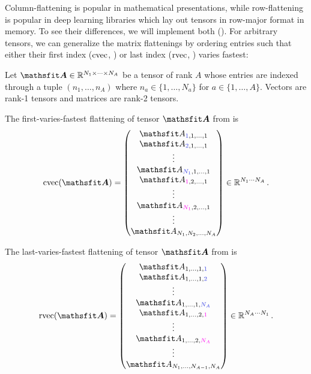 Column-flattening is popular in mathematical presentations, while row-flattening is popular in deep learning libraries which lay out tensors in row-major format in memory.
To see their differences, we will implement both ().
For arbitrary tensors, we can generalize the matrix flattenings by ordering entries such that either their first index ($\operatorname{cvec}$, ) or last index ($\operatorname{rvec}$, ) varies fastest:


\begin{setup}\label{setup:flattening}
  Let $\tA \in \sR^{N_1 \times \dots \times N_A}$ be a tensor of rank $A$ whose entries are indexed through a tuple $(n_1, \dots, n_A)$ where $n_a \in \{1, \dots, N_a\}$ for $a \in \{1, \dots, A\}$.
  Vectors are rank-1 tensors and matrices are rank-2 tensors.
\end{setup}
\begin{definition}\label{def:cvec}
  The first-varies-fastest flattening of tensor $\tA$ from  is
  \begin{align*}
    \cvec(\tA) =
    \begin{pmatrix}
      \etA_{\colored{1},1,\dots,1}   \\
      \etA_{\colored{2},1,\dots,1}   \\
      \vdots               \\
      \etA_{\colored{N_1},1,\dots,1} \\
      \etA_{\colored[VectorPink]{1},2,\dots,1}   \\
      \vdots               \\
      \etA_{\colored[VectorPink]{N_1},2,\dots,1} \\
      \vdots               \\
      \etA_{N_1,N_2,\dots,N_A}
    \end{pmatrix}
    \in \sR ^{N_1 \cdots N_A}\,.
  \end{align*}
\end{definition}

\begin{definition}\label{def:rvec}
  The last-varies-fastest flattening of tensor $\tA$ from  is
  \begin{align*}
    \rvec(\tA) =
    \begin{pmatrix}
      \etA_{1,\dots,1,\colored{1}}   \\
      \etA_{1,\dots,1,\colored{2}}   \\
      \vdots               \\
      \etA_{1,\dots,1,\colored{N_A}} \\
      \etA_{1,\dots,2,\colored[VectorPink]{1}}   \\
      \vdots               \\
      \etA_{1,\dots,2,\colored[VectorPink]{N_A}} \\
      \vdots               \\
      \etA_{N_1,\dots,N_{A-1},N_A}
    \end{pmatrix}
    \in \sR ^{N_A \cdots N_1}\,.
  \end{align*}
\end{definition}

